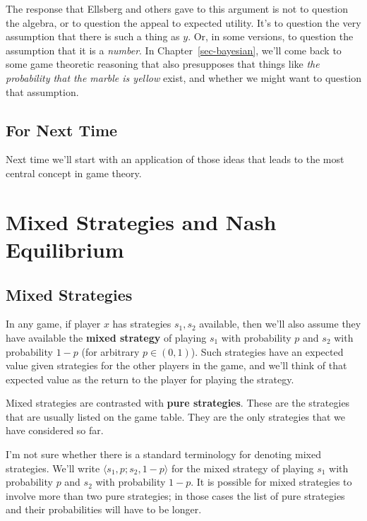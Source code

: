 \documentclass[
  11pt,
  letterpaper,
]{scrbook}
\begin{document}
The response that Ellsberg and others gave to this argument is not to
question the algebra, or to question the appeal to expected utility.
It's to question the very assumption that there is such a thing as
\(y\). Or, in some versions, to question the assumption that it is a
\emph{number}. In Chapter~\ref{sec-bayesian}, we'll come back to some
game theoretic reasoning that also presupposes that things like
\emph{the probability that the marble is yellow} exist, and whether we
might want to question that assumption.

\section{For Next Time}\label{sec-ch2-next-time}

Next time we'll start with an application of those ideas that leads to
the most central concept in game theory.


\chapter{Mixed Strategies and Nash
Equilibrium}\label{sec-mixed-and-nash}

\section{Mixed Strategies}\label{sec-mixed-strategies}

In any game, if player \(x\) has strategies \(s_1, s_2\) available, then
we'll also assume they have available the \textbf{mixed strategy} of
playing \(s_1\) with probability \(p\) and \(s_2\) with probability
\(1-p\) (for arbitrary \(p \in (0, 1)\)). Such strategies have an
expected value given strategies for the other players in the game, and
we'll think of that expected value as the return to the player for
playing the strategy.

Mixed strategies are contrasted with \textbf{pure strategies}. These are
the strategies that are usually listed on the game table. They are the
only strategies that we have considered so far.

I'm not sure whether there is a standard terminology for denoting mixed
strategies. We'll write \(\langle s_1, p; s_2, 1-p \rangle\) for the
mixed strategy of playing \(s_1\) with probability \(p\) and \(s_2\)
with probability \(1-p\). It is possible for mixed strategies to involve
more than two pure strategies; in those cases the list of pure
strategies and their probabilities will have to be longer.
\end{document}
